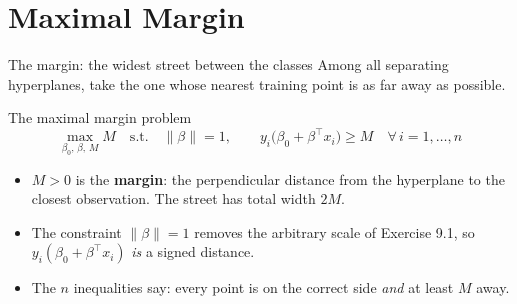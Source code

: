 \documentclass[aspectratio=169,11pt]{beamer}
\begin{document}
\section{Maximal Margin}

\begin{frame}{The margin: the widest street between the classes}
  \footnotesize
  Among all separating hyperplanes, take the one whose nearest training point
  is as far away as possible.
  \begin{block}{The maximal margin problem}
    \[
      \boxed{\;
      \max_{\beta_0,\,\beta,\,M} M
      \quad\text{s.t.}\quad
      \|\beta\| = 1,\qquad
      y_i\big(\beta_0+\beta^\top x_i\big) \ge M \quad \forall\, i=1,\dots,n \;}
    \]
  \end{block}
  \begin{readme}
    \begin{itemize}
      \item $M>0$ is the \textbf{margin}: the perpendicular distance from the
            hyperplane to the closest observation. The street has total width
            $2M$.
      \item The constraint $\|\beta\|=1$ removes the arbitrary scale of
            Exercise 9.1, so $y_i(\beta_0+\beta^\top x_i)$ \emph{is} a signed
            distance.
      \item The $n$ inequalities say: every point is on the correct side
            \emph{and} at least $M$ away.
    \end{itemize}
  \end{readme}
\end{frame}
\end{document}
